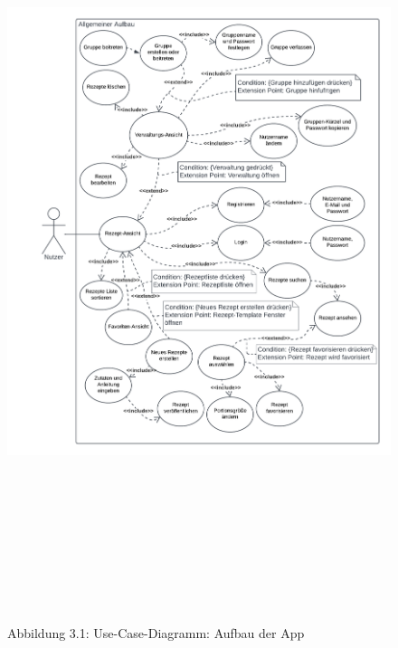 \documentclass[parskip=full]{scrartcl}
\begin{document}
\begin{figure}[!htp]
    \centering
    \begin{adjustbox}{right=160mm}
        \includegraphics[height=220mm]{images/section3/Use-Case-Diagramm Aufbau App.png}
    \end{adjustbox}
    Abbildung 3.1: Use-Case-Diagramm: Aufbau der App
    \label{fig:A31}
\end{figure}
\newpage
\end{document}
